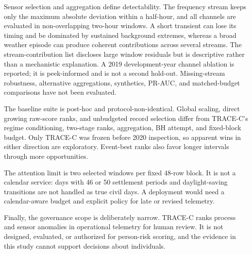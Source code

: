 Sensor selection and aggregation define detectability. The frequency stream
keeps only the maximum absolute deviation within a half-hour, and all channels
are evaluated in non-overlapping two-hour windows. A short transient can lose
its timing and be dominated by sustained background extremes, whereas a broad
weather episode can produce coherent contributions across several streams.
The stream-contribution list discloses large window residuals but is descriptive
rather than a mechanistic explanation. A 2019 development-year channel ablation
is reported; it is peek-informed and is not a second hold-out. Missing-stream
robustness, alternative aggregations, synthetics, PR-AUC, and matched-budget
comparisons have not been evaluated.

The baseline suite is post-hoc and protocol-non-identical. Global scaling,
direct growing raw-score ranks, and unbudgeted record selection differ from
TRACE-C's regime conditioning, two-stage ranks, aggregation, BH attempt, and
fixed-block budget. Only TRACE-C was frozen before 2020 inspection, so apparent
wins in either direction are exploratory. Event-best ranks also favor longer
intervals through more opportunities.

The attention limit is two selected windows per fixed 48-row block. It is not a
calendar service: days with 46 or 50 settlement periods and daylight-saving
transitions are not handled as true civil days. A deployment would need a
calendar-aware budget and explicit policy for late or revised telemetry.

Finally, the governance scope is deliberately narrow. TRACE-C ranks process
and sensor anomalies in operational telemetry for human review. It is not
designed, evaluated, or authorized for person-risk scoring, and the evidence in
this study cannot support decisions about individuals.
